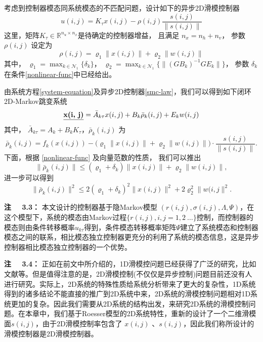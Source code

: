 	考虑到控制器模态同系统模态的不匹配问题，设计如下的异步2D滑模控制器
	\begin{equation}\label{smc-law}
	u(i,j) = K_{\tau }x(i,j)-\rho(i,j)\frac{s(i,j)}{\|s(i,j)\|}
	\end{equation}
	这里，矩阵$K_{\tau }\in\mathbb{R}^{n_u\times n_x}$是待确定的控制器增益， 且满足 $n_x=n_h+n_v$， 参数 $\rho(i,j)$ 设定为
	\begin{equation}\label{varrho}
	\rho(i,j) = \varrho_{1}\|x(i,j)\| + \varrho_{2}\|w(i,j)\|
	\end{equation}
	其中， $\varrho_{1}=\max_{k\in\mathcal{N}_{1}} \{\delta_{k} \}$， $\varrho_{2} = \max_{k\in\mathcal{N}_{1}}\{\|(GB_{k})^{-1}GE_{k}\| \} $， 参数 $\delta_{k}$ 在条件\eqref{nonlinear-func}中已经给出。 
	
	由系统方程\eqref{system-equation}及异步2D控制器\eqref{smc-law}，我们可以得到如下闭环2D-Markov跳变系统
	\begin{equation} \label{closed-loop-system-equation}
	\emph{\textbf{x(i, j)}} = \bar{A}_{k\tau }x(i,j)+B_{k}\bar{\rho}_{k}(i,j)+E_{k}w(i,j)
	\end{equation}
	其中， $\bar{A}_{k\tau } = A_{k}+B_{k}K_{\tau }$，$\bar{\rho}_{k}(i,j)$ 为
	\begin{equation*}
	\bar\rho_{k}(i,j)=f_{k}(x(i,j))-\big(\varrho_{1}\|x(i,j)\|+\varrho_{2}\|w(i,j)\|\big)\cdot\frac{s(i,j)}{\|s(i,j)\|}.
	\end{equation*}
	下面，根据 \eqref{nonlinear-func} 及向量范数的性质， 我们可以推出
	\begin{equation}\label{norm-rho-inequality}
	\|\bar{\rho}_{k}(i,j)\| \leq (\varrho_{1}+\delta_{k})\|x(i,j)\| + \varrho_{2}\|w(i,j)\| ,
	\end{equation} 
	进一步可以得到
	\begin{equation}\label{rholeseq}
	\|\bar{\rho}_{k}(i,j)\|^{2} \leq 2(\varrho_{1}+\delta_{k})^{2}\|x(i,j)\|^{2} +2\varrho_{2}^{2}\|w(i,j\|^{2} .
	\end{equation}	
	
	{\bf 注 \ \ 3.3：}
	本文设计的控制器基于隐Markov模型 $(r(i,j),\sigma(i,j),\varLambda,\varPsi)$，在这个模型下，系统的模态由Markov过程$\{r(i,j), i,j=1,2\ \dots\}$控制，而控制器的模态则由条件转移概率$u_{k\tau}$得到，条件模态转移概率矩阵$\varPsi$建立了系统模态和控制器模态之间的联系，相比模态独立控制器更充分的利用了系统的模态信息，这是异步控制器相比模态独立控制器的一个优势。
	
	{\bf 注 \ \ 3.4：}
	正如在前文中所介绍的，1D滑模控问题已经获得了广泛的研究，比如文献\cite{song2018asynchronous,li2017passivity,qi2018observer}等。但是值得注意的是，2D滑模控制(不仅仅是异步控制)问题目前还没有人进行研究。实际上，2D系统的特殊性质给系统分析带来了更大的复杂性，1D系统得到的诸多结论不能直接的推广到2D系统中来，2D系统的滑模控制问题相对1D系统更加的复杂。因此我们需要从2D系统的结构出发，来研究2D系统的滑模控制问题。在本章中，我们基于Roesser模型的2D系统特性，重新的设计了一个二维滑模面$s(i,j)$，由于2D滑模控制率包含了 $x(i,j)$ 、$s(i,j)$，因此我们称所设计的滑模控制器是2D滑模控制器。

